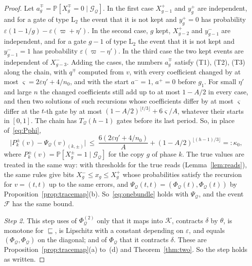 \documentclass[11pt]{amsart}
\theoremstyle{definition}
\theoremstyle{remark}
\newcommand{\eps}{\varepsilon}
\newcommand{\PP}{\mathbb{P}}
\begin{document}
\begin{proof}
Let $a^\mp_g=\PP[X^\mp_g=0\mid\mathcal G_{\mathcal Q}]$. In the first case $X^+_{g-1}$ and
$y^+_g$ are independent, and for a gate of type $\mathrm L_2$ the event that it is not kept and
$y^+_g=0$ has probability $\eps(1-1/g)-\eps(\varpi+\eta')$. In the second case, $g$ kept,
$X^+_{g-2}$ and $y^-_{g-1}$ are independent, and for a gate $g-1$ of type $\mathrm L_2$ the
event that it is not kept and $y^-_{g-1}=1$ has probability $\eps(\varpi-\eta')$. In the third
case the two kept events are independent of $X^-_{g-3}$. Adding the cases, the numbers
$a^\mp_g$ satisfy (T1), (T2), (T3) along the chain, with $q^\mp$ computed from $v$, with every
coefficient changed by at most $\varsigma=2\eps\eta'+4/n_0$, and with the start $a^-=1$,
$a^+=0$ before $g_1$. For small $\eta'$ and large $n$ the changed coefficients still add up to
at most $1-A/2$ in every case, and then two solutions of such recursions whose coefficients
differ by at most $\varsigma$ differ at the $t$-th gate by at most
$(1-A/2)^{\lfloor t/3\rfloor}+6\varsigma/A$, whatever their starts in $[0,1]$. The chain has $T_{\mathcal Q}(h-1)$ gates before
its last period. So, in place of~\eqref{eq:Pphi},
\[
\bigl|P^\pm_k(v)-\Psi_{\mathcal Q}(v)_{(k,\pm)}\bigr|\ \le\ \frac{6(2\eps\eta'+4/n_0)}{A}+(1-A/2)^{\lfloor(h-1)/3\rfloor}=:\kappa_0,
\]
where $P^\pm_k(v)=\PP[X^\pm_g=1\mid\mathcal G_{\mathcal Q}]$ for the copy $g$ of phase $k$. The
true values are treated in the same way: with thresholds for the true reads
(Lemma~\ref{lem:reads}), the same rules give bits $X^-_g\le x_g\le X^+_g$ whose probabilities
satisfy the recursion for $v=(t,t)$ up to the same errors, and
$\Psi_{\mathcal Q}(t,t)=(\Phi_{\mathcal Q}(t),\Phi_{\mathcal Q}(t))$ by
Proposition~\ref{prop:tracemap}(b). So~\eqref{eq:onebundle} holds with $\Psi_{\mathcal Q}$, and
the event $\mathcal F$ has the same bound.

\emph{Step 2.} This step uses of $\Phi^{(2)}_{\mathcal Q}$ only that it maps into $\mathcal K$,
contracts $\delta$ by $\theta$, is monotone for $\sqsubseteq$, is Lipschitz with a constant
depending on $\eps$, and equals $(\Phi_{\mathcal Q},\Phi_{\mathcal Q})$ on the diagonal; and of
$\Phi_{\mathcal Q}$ that it contracts $\delta$. These are Proposition~\ref{prop:tracemap}(a)
to~(d) and Theorem~\ref{thm:two}. So the step holds as written.


\end{proof}
\end{document}
